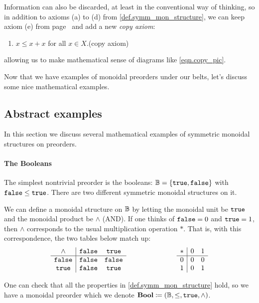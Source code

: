 \documentclass[7Sketches]{subfiles}
\begin{document}
Information can also be discarded, at least in the conventional way of thinking,
so in addition to axioms (a) to (d) from \cref{def.symm_mon_structure}, we can
keep axiom (e) from page~\pageref{page.discard_axiom} and add a new \emph{copy axiom}:
\bigskip
\begin{enumerate}[label=(f)]
	\item $x\leq x+x$ for all $x\in X$.\hfill{(copy axiom)}%
\label{page.copy_axiom}
\end{enumerate}
\bigskip
allowing us to make mathematical sense of diagrams like \cref{eqn.copy_pic}.%
%

Now that we have examples of monoidal preorders under our belts, let's discuss some
nice mathematical examples.

%
\subsection{Abstract examples}%
\label{subsec.SMPs_pure_math}

In this section we discuss several mathematical examples of symmetric monoidal structures on preorders.

\paragraph{The Booleans}

The simplest nontrivial preorder is the booleans: $\mathbb{B}=\{\mathtt{true},\mathtt{false}\}$ with $\mathtt{false}\leq\mathtt{true}$. There are two different symmetric monoidal structures on it.

\begin{example}%
\label{ex.Bool}%
We can define a monoidal structure on $\mathbb{B}$ by letting the monoidal unit be $\mathtt{true}$ and the monoidal product be $\wedge$ (AND). If one thinks of $\mathtt{false}=0$ and $\mathtt{true}=1$, then $\wedge$ corresponds to the usual multiplication operation $*$. That is, with this correspondence, the two tables below match up:
\begin{equation}%
\label{eqn.wedge_mult_table}
\begin{array}{c | c c}
	\wedge&\false&\true\\\hline
	\false&\false&\false\\
	\true&\false&\true
\end{array}
\hspace{1in}
\begin{array}{c | c c}
	*&0&1\\\hline
	0&0&0\\
	1&0&1
\end{array}
\end{equation}

One can check that all the properties in \cref{def.symm_mon_structure} hold, so we have a monoidal preorder which we denote $\mathbf{Bool}\coloneqq(\mathbb{B},\leq,\mathtt{true},\wedge)$.
\end{example}
\end{document}

